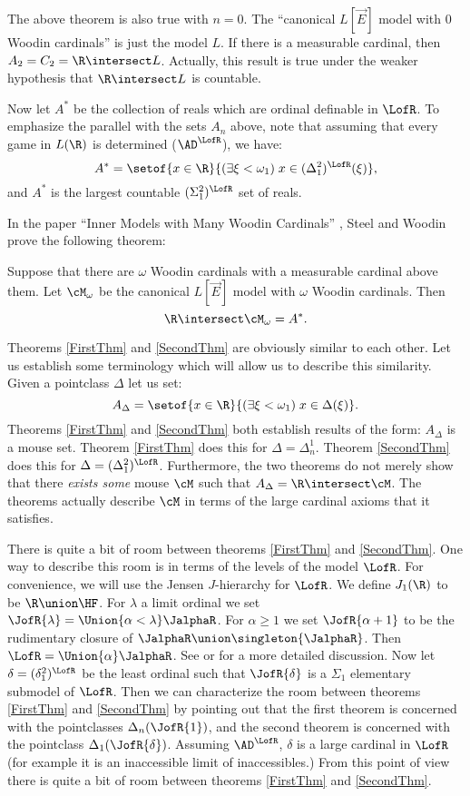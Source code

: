 The above theorem is also true with $n=0$. The ``canonical $L[\vec{E}]$
model with $0$ Woodin cardinals'' is just the model $L$. If there is
a measurable cardinal, then $A_2=C_2=\R\intersect L$. Actually, this result
is true under the weaker hypothesis that $\R\intersect L$ is countable.

Now let $A^*$ be the collection of reals which are ordinal definable in
$\LofR$.
To emphasize the parallel with the sets $A_n$ above, note that assuming
that every game in $L(\R)$ is determined ($\AD^{\LofR}$), we have:
$$A^*=\setof{x\in\R}{(\exists\xi<\omega_1)\;
x\in(\Delta^2_1)^{\LofR}(\xi)},$$
and $A^*$ is the largest countable $(\Sigma^2_1)^{\LofR}$ set of reals.

In the paper ``Inner Models with Many Woodin Cardinals''
\cite{Many_Woodins}, Steel
and Woodin prove
the following theorem:

\begin{theorem}
\label{SecondThm}
 Suppose that there are $\omega$ Woodin
cardinals with a measurable cardinal above them. Let
$\cM_{\omega}$ be the canonical $L[\vec{E}]$ model with $\omega$ Woodin
cardinals. Then
$$\R\intersect\cM_{\omega}=A^*.$$
\end{theorem}

Theorems \ref{FirstThm} and \ref{SecondThm} are obviously similar to
each other. Let us establish some terminology which will allow us to
describe this similarity.
Given a pointclass $\Delta$ let us set:
$$A_{\Delta}=\setof{x\in\R}{(\exists\xi<\omega_1)\; x\in\Delta(\xi)}.$$
Theorems  \ref{FirstThm} and \ref{SecondThm} both establish
results of the form:
$A_{\Delta}$ is a mouse set. Theorem \ref{FirstThm} does this for
$\Delta=\Delta^1_n$. Theorem \ref{SecondThm} does this for
$\Delta=(\Delta^2_1)^{\LofR}$. Furthermore, the two theorems do
not merely show that there \emph{exists some} mouse $\cM$ such
that $A_{\Delta}=\R\intersect\cM$. The theorems actually describe
$\cM$ in terms of the large cardinal axioms that it satisfies.

There is quite a bit of
 room between theorems \ref{FirstThm} and \ref{SecondThm}.
One  way to describe this room is in terms of the levels of the model
$\LofR$. For convenience, we will use the Jensen $J$-hierarchy for
$\LofR$. We define $J_1(\R)$ to be $\R\union\HF$. For
$\lambda$ a limit ordinal we set
$\JofR{\lambda}=\Union{\alpha<\lambda}\JalphaR$. For $\alpha\geq 1$
we set $\JofR{\alpha+1}$ to be the rudimentary closure of
$\JalphaR\union\singleton{\JalphaR}$. Then $\LofR=\Union{\alpha}\JalphaR$.
See \cite{Scales_In_LofR} or \cite{Mouse_Sets} for a more detailed
discussion. Now let $\delta=(\delta^2_1)^{\LofR}$
be the least ordinal such that
$\JofR{\delta}$ is a $\Sigma_1$ elementary submodel of $\LofR$.
Then we can characterize the room between theorems \ref{FirstThm}
and \ref{SecondThm} by pointing out that the first theorem is
concerned  with the pointclasses $\Delta_n(\JofR{1})$, and the
second theorem is concerned with the pointclass $\Delta_1(\JofR{\delta})$.
Assuming $\AD^{\LofR}$, $\delta$ is a large cardinal in $\LofR$ (for
example it is an inaccessible limit of inaccessibles.)
From this point of view there is quite a bit of
 room between
theorems \ref{FirstThm} and \ref{SecondThm}.

